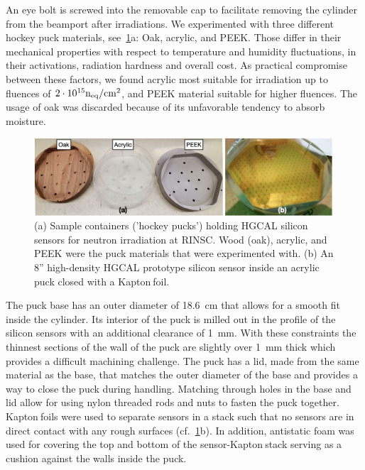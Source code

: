 An eye bolt is screwed into the removable cap to facilitate removing the cylinder from the beamport after irradiations.
We experimented with three different hockey puck materials, see~\ref{fig:Pucks_Arrayed}a: Oak, acrylic, and PEEK. 
Those differ in their mechanical properties with respect to temperature and humidity fluctuations, in their activations, radiation hardness and overall cost.
As practical compromise between these factors, we found acrylic most suitable for irradiation up to fluences of $2\cdot 10^{15}\mathrm{n_{eq}}/\mathrm{cm}^{2}$, and PEEK material suitable for higher fluences. 
The usage of oak was discarded because of its unfavorable tendency to absorb moisture.
\begin{figure}[!hbt]
  \begin{center}
    \includegraphics[width=0.99\textwidth]{figures/figures_edited_002.jpeg}
    \caption{(a) Sample containers ('hockey pucks') holding HGCAL silicon sensors for neutron irradiation at RINSC. 
    Wood (oak), acrylic, and PEEK were the puck materials that were experimented with.
    (b) An 8'' high-density HGCAL prototype silicon sensor inside an acrylic puck closed with a Kapton\texttrademark$~$foil.}
    \label{fig:Pucks_Arrayed}
  \end{center}
\end{figure}
The puck base has an outer diameter of \SI{18.6}{\centi\metre} that allows for a smooth fit inside the cylinder. 
Its interior of the puck is milled out in the profile of the silicon sensors with an additional clearance of \SI{1}{\milli\metre}. 
With these constraints the thinnest sections of the wall of the puck are slightly over \SI{1}{\milli\metre} thick which provides a difficult machining challenge.
The puck has a lid, made from the same material as the base, that matches the outer diameter of the base and provides a way to close the puck during handling.
Matching through holes in the base and lid allow for using nylon threaded rods and nuts to fasten the puck together. 
Kapton\texttrademark$~$foils were used to separate sensors in a stack such that no sensors are in direct contact with any rough surfaces (cf.~\ref{fig:Pucks_Arrayed}b).
In addition, antistatic foam was used for covering the top and bottom of the sensor-Kapton\texttrademark$~$stack serving as a cushion  against the walls inside the puck.
